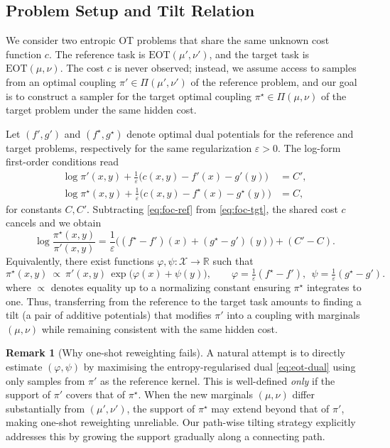 \documentclass[11pt]{article}
\theoremstyle{definition}
\newtheorem{remark}[theorem]{Remark}
\numberwithin{equation}{section}%
\begin{document}
\subsection{Problem Setup and Tilt Relation}
We consider two entropic OT problems that share the same unknown cost function $c$. The reference task is $\mathrm{EOT}(\mu',\nu')$, and the target task is $\mathrm{EOT}(\mu,\nu)$. The cost $c$ is never observed; instead, we assume access to samples from an optimal coupling $\pi'\in\Pi(\mu',\nu')$ of the reference problem, and our goal is to construct a sampler for the target optimal coupling $\pi^\star\in\Pi(\mu,\nu)$ of the target problem under the same hidden cost.

Let $(f',g')$ and $(f^\star,g^\star)$ denote optimal dual potentials for the reference and target problems, respectively for the same regularization $\varepsilon>0$. The log-form first-order conditions read
\begin{align}
\log \pi'(x,y) + \frac{1}{\varepsilon}\big(c(x,y)-f'(x)-g'(y)\big) &= C', \label{eq:foc-ref}\\
\log \pi^\star(x,y) + \frac{1}{\varepsilon}\big(c(x,y)-f^\star(x)-g^\star(y)\big) &= C, \label{eq:foc-tgt}
\end{align}
for constants $C,C'$. Subtracting \eqref{eq:foc-ref} from \eqref{eq:foc-tgt}, the shared cost $c$ cancels and we obtain
\[
\log\frac{\pi^\star(x,y)}{\pi'(x,y)}
=\frac{1}{\varepsilon}\Big((f^\star-f')(x)+(g^\star-g')(y)\Big) + (C'-C).
\]
Equivalently, there exist functions $\varphi,\psi:\mathcal X\to\mathbb{R}$ such that
\begin{equation}
\label{eq:tilt-relation}
\pi^\star(x,y)\ \propto\ \pi'(x,y)\,\exp\!\big(\varphi(x)+\psi(y)\big),
\qquad
\varphi=\tfrac{1}{\varepsilon}(f^\star-f'),\ \ \psi=\tfrac{1}{\varepsilon}(g^\star-g').
\end{equation}
where $\propto$ denotes equality up to a normalizing constant ensuring $\pi^\star$ integrates to one. Thus, transferring from the reference to the target task amounts to finding a tilt (a pair of additive potentials) that modifies $\pi'$ into a coupling with marginals $(\mu,\nu)$ while remaining consistent with the same hidden cost.

\begin{remark}[Why one-shot reweighting fails]
\label{rem:one-shot-fails}
A natural attempt is to directly estimate $(\varphi,\psi)$ by maximising the entropy-regularised dual \eqref{eq:eot-dual} using only samples from $\pi'$ as the reference kernel.
This is well-defined \textit{only} if the support of $\pi'$ covers that of $\pi^\star$.
When the new marginals $(\mu,\nu)$ differ substantially from $(\mu',\nu')$, the support of $\pi^\star$ may extend beyond that of $\pi'$, making one-shot reweighting unreliable.
Our path-wise tilting strategy explicitly addresses this by growing the support gradually along a connecting path.
\end{remark}
\end{document}
